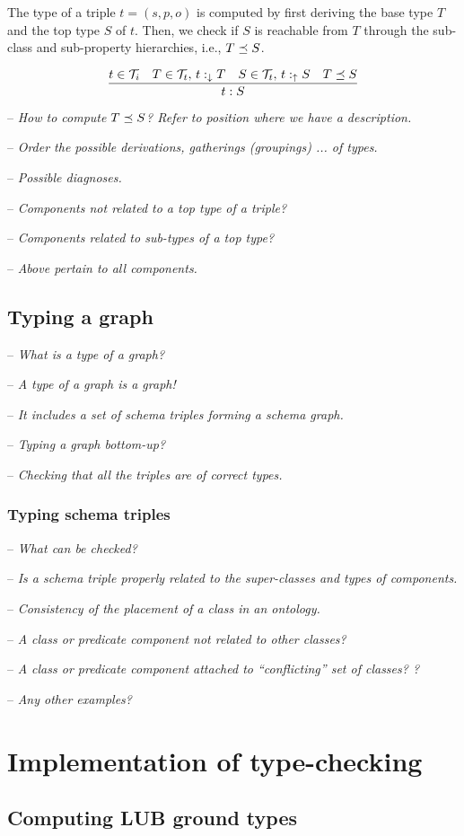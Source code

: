\documentclass[runningheads]{llncs}
\newcommand{\darr}{\downarrow}
\newcommand{\uarr}{\uparrow}
\newcommand{\T}{{\cal T}}
\newcommand{\notes}[1]{\noindent\begin{small}-- \emph{#1}\\\end{small}}
\begin{document}
The type of a triple $t=(s,p,o)$ is computed by first deriving the
base type $T$ and the top type $S$ of $t$. Then, we check if $S$ is
reachable from $T$ through the sub-class and sub-property hierarchies,
i.e., $T\preceq\/S$.

\begin{equation}
\dfrac{t\in\T_i\quad T\in\T_t,\, t:_{\darr}T\quad S\in\T_t,\, t:_\uarr\/S\quad T\preceq\/S}
      {t:S}
\end{equation}

\medskip

\medskip
\notes{How to compute $T\preceq\/S$? Refer to position where we have a description.}
\notes{Order the possible derivations, gatherings (groupings) ... of types.}

\notes{Possible diagnoses.}
\notes{Components not related to a top type of a triple?}
\notes{Components related to sub-types of a top type?}
\notes{Above pertain to all components.}




\subsection{Typing a graph}

\notes{What is a type of a graph?}
\notes{A type of a graph is a graph!}
\notes{It includes a set of schema triples forming a schema graph.}

\notes{Typing a graph bottom-up?}
\notes{Checking that all the triples are of correct types.}

\subsubsection{Typing schema triples}

\notes{What can be checked?}
\notes{Is a schema triple properly related to the super-classes and types of components.}
\notes{Consistency of the placement of a class in an ontology.}
\notes{A class or predicate component not related to other classes?}
\notes{A class or predicate component attached to ``conflicting'' set of classes? ?}
\notes{Any other examples?}





\section{Implementation of type-checking}


\subsection{Computing LUB ground types}
\end{document}
